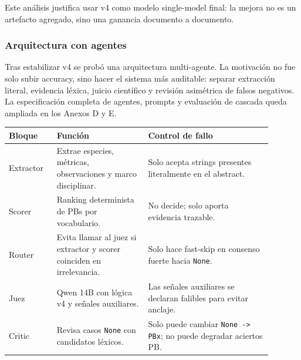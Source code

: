 
Este análisis justifica usar v4 como modelo single-model final: la mejora no es un artefacto agregado, sino una ganancia documento a documento.

\subsubsection{Arquitectura con agentes}

Tras estabilizar v4 se probó una arquitectura multi-agente. La motivación no fue solo subir accuracy, sino hacer el sistema más auditable: separar extracción literal, evidencia léxica, juicio científico y revisión asimétrica de falsos negativos. La especificación completa de agentes, prompts y evaluación de cascada queda ampliada en los Anexos D y E.


\begin{center}
\scriptsize
\setlength{\tabcolsep}{4pt}
\renewcommand{\arraystretch}{1.15}
\begin{tabular}{p{0.16\linewidth}p{0.31\linewidth}p{0.42\linewidth}}
\toprule
Bloque & Función & Control de fallo \\
\midrule
Extractor & Extrae especies, métricas, observaciones y marco disciplinar. & Solo acepta strings presentes literalmente en el abstract. \\
Scorer & Ranking determinista de PBs por vocabulario. & No decide; solo aporta evidencia trazable. \\
Router & Evita llamar al juez si extractor y scorer coinciden en irrelevancia. & Solo hace fast-skip en consenso fuerte hacia \texttt{None}. \\
Juez & Qwen 14B con lógica v4 y señales auxiliares. & Las señales auxiliares se declaran falibles para evitar anclaje. \\
Critic & Revisa casos \texttt{None} con candidatos léxicos. & Solo puede cambiar \texttt{None -> PBx}; no puede degradar aciertos PB. \\
\bottomrule
\end{tabular}
\end{center}

